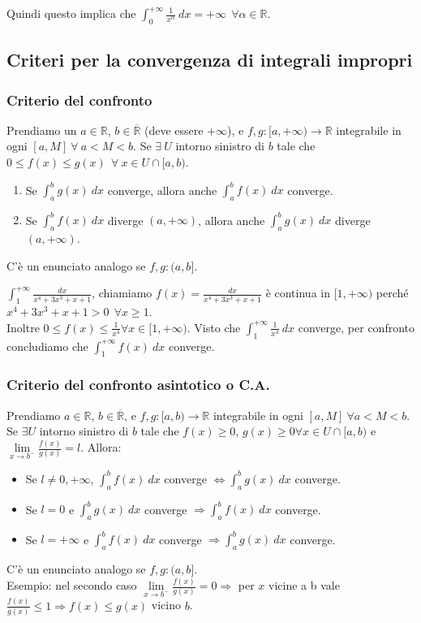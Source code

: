 \begin{observation}
Quindi questo implica che $\int_0^{+\infty}\frac{1}{x^{\alpha}}\:dx = +\infty \:\: \forall \alpha \in \mathbb{R}$.
\end{observation}

\subsection{Criteri per la convergenza di integrali impropri}
\subsubsection{Criterio del confronto}
Prendiamo un $a\in \mathbb{R}$, $b\in \mathbb{\overline{R}}$ (deve essere $+\infty$), e $f,g: [a,+\infty)\to \mathbb{R}$ integrabile in ogni $[a,M] \: \forall \: a<M<b$. Se $\exists \: U$ intorno sinistro di $b$ tale che $0 \leq f(x) \leq g(x) \:\: \forall \: x\in U \cap [a,b)$.
\begin{enumerate}
    \item Se $\int_a^b g(x)\:dx$ converge, allora anche $\int_a^b f(x)\:dx$ converge.
    \item Se $\int_a^b f(x)\:dx$ diverge $(a,+\infty)$, allora anche $\int_a^b g(x)\:dx$ diverge $(a,+\infty)$.
\end{enumerate}
C'è un enunciato analogo se $f,g: (a,b]$.

\begin{example}
$\int_1^{+\infty}\frac{dx}{x^4+3x^3+x+1}$, chiamiamo $f(x) = \frac{dx}{x^4+3x^3+x+1}$ è continua in $[1,+\infty)$ perché $x^4+3x^3+x+1 > 0 \:\: \forall x \geq 1$.\\
Inoltre $0\leq f(x) \leq \frac{1}{x^4} \forall x\in [1,+\infty)$. Visto che $\int_1^{+\infty}\frac{1}{x^4}\:dx$ converge, per confronto concludiamo che $\int_1^{+\infty}f(x)\:dx$ converge.
\end{example}

\subsubsection{Criterio del confronto asintotico o C.A.}
Prendiamo $a\in \mathbb{R}$, $b\in \mathbb{\overline{R}}$, e $f,g: [a,b)\to \mathbb{R}$ integrabile in ogni $[a,M] \: \forall a<M<b$. Se $\exists U$ intorno sinistro di $b$ tale che $f(x) \geq 0$, $g(x) \geq 0 \forall x \in U \cap [a,b)$ e $\lim\limits_{x\to b^-}\frac{f(x)}{g(x)}=l$. Allora:
\begin{itemize}
    \item Se $l\neq 0,+\infty$, $\int_a^b f(x)\:dx$ converge $\Longleftrightarrow \int_a^b g(x)\:dx$ converge.
    \item Se $l = 0$ e $\int_a^b g(x)\:dx$ converge $\Longrightarrow \int_a^b f(x)\:dx$ converge.
    \item Se $l = +\infty$ e $\int_a^b f(x)\:dx$ converge $\Longrightarrow \int_a^b g(x)\:dx$ converge.
\end{itemize}
C'è un enunciato analogo se $f,g: (a,b]$.\\
Esempio: nel secondo caso $\lim\limits_{x\to b^-}\frac{f(x)}{g(x)}=0 \Longrightarrow$ per $x$ vicine a b vale $\frac{f(x)}{g(x)}\leq 1 \Longrightarrow f(x) \leq g(x)$ vicino $b$.

